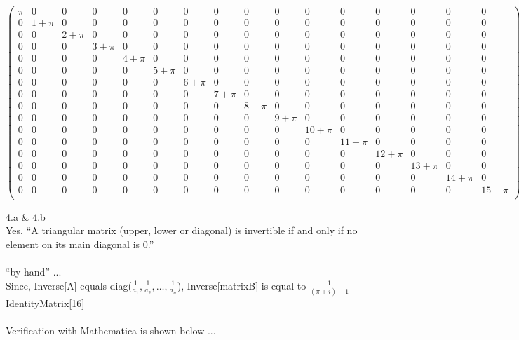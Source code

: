 \documentclass[11pt,a4paper]{article}
\begin{document}
\begin{doublespace}
\noindent\(\left(
\begin{array}{cccccccccccccccc}
 \pi  & 0 & 0 & 0 & 0 & 0 & 0 & 0 & 0 & 0 & 0 & 0 & 0 & 0 & 0 & 0 \\
 0 & 1+\pi  & 0 & 0 & 0 & 0 & 0 & 0 & 0 & 0 & 0 & 0 & 0 & 0 & 0 & 0 \\
 0 & 0 & 2+\pi  & 0 & 0 & 0 & 0 & 0 & 0 & 0 & 0 & 0 & 0 & 0 & 0 & 0 \\
 0 & 0 & 0 & 3+\pi  & 0 & 0 & 0 & 0 & 0 & 0 & 0 & 0 & 0 & 0 & 0 & 0 \\
 0 & 0 & 0 & 0 & 4+\pi  & 0 & 0 & 0 & 0 & 0 & 0 & 0 & 0 & 0 & 0 & 0 \\
 0 & 0 & 0 & 0 & 0 & 5+\pi  & 0 & 0 & 0 & 0 & 0 & 0 & 0 & 0 & 0 & 0 \\
 0 & 0 & 0 & 0 & 0 & 0 & 6+\pi  & 0 & 0 & 0 & 0 & 0 & 0 & 0 & 0 & 0 \\
 0 & 0 & 0 & 0 & 0 & 0 & 0 & 7+\pi  & 0 & 0 & 0 & 0 & 0 & 0 & 0 & 0 \\
 0 & 0 & 0 & 0 & 0 & 0 & 0 & 0 & 8+\pi  & 0 & 0 & 0 & 0 & 0 & 0 & 0 \\
 0 & 0 & 0 & 0 & 0 & 0 & 0 & 0 & 0 & 9+\pi  & 0 & 0 & 0 & 0 & 0 & 0 \\
 0 & 0 & 0 & 0 & 0 & 0 & 0 & 0 & 0 & 0 & 10+\pi  & 0 & 0 & 0 & 0 & 0 \\
 0 & 0 & 0 & 0 & 0 & 0 & 0 & 0 & 0 & 0 & 0 & 11+\pi  & 0 & 0 & 0 & 0 \\
 0 & 0 & 0 & 0 & 0 & 0 & 0 & 0 & 0 & 0 & 0 & 0 & 12+\pi  & 0 & 0 & 0 \\
 0 & 0 & 0 & 0 & 0 & 0 & 0 & 0 & 0 & 0 & 0 & 0 & 0 & 13+\pi  & 0 & 0 \\
 0 & 0 & 0 & 0 & 0 & 0 & 0 & 0 & 0 & 0 & 0 & 0 & 0 & 0 & 14+\pi  & 0 \\
 0 & 0 & 0 & 0 & 0 & 0 & 0 & 0 & 0 & 0 & 0 & 0 & 0 & 0 & 0 & 15+\pi  \\
\end{array}
\right)\)
\end{doublespace}

4.a $\&$ 4.b\\
Yes, {``}A triangular matrix (upper, lower or diagonal) is invertible if and only if no element on its main diagonal is 0.{''}\\
\\
{``}by hand{''} ...\\
Since, Inverse[A] equals diag($\frac{1}{a_1},\frac{1}{a_2},\ldots ,\frac{1}{a_n}$), Inverse[matrixB] is equal to $\frac{1}{(\pi +i)-1}$IdentityMatrix[16]\\
\\
Verification with Mathematica is shown below ...
\end{document}
